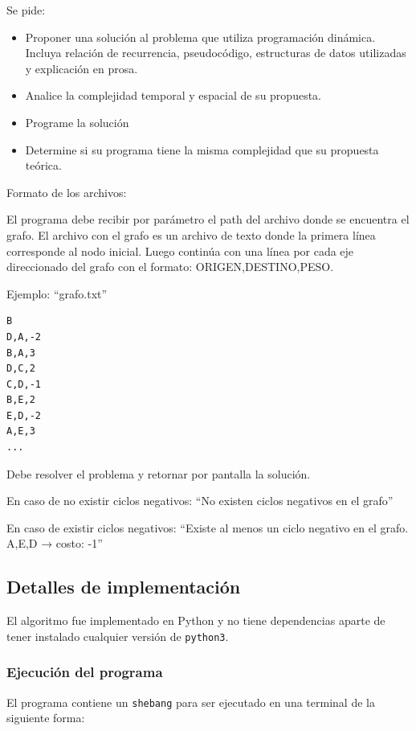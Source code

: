 \documentclass[titlepage,a4paper]{article}
\begin{document}
Se pide:

\begin{itemize}
\item Proponer una solución al problema que utiliza programación dinámica. Incluya relación de recurrencia, pseudocódigo, estructuras de datos utilizadas y explicación en prosa.

\item Analice la complejidad temporal y espacial de su propuesta.

\item Programe la solución

\item Determine si su programa tiene la misma complejidad que su propuesta teórica.
\end{itemize}

Formato de los archivos:

El programa debe recibir por parámetro el path del archivo donde se encuentra el grafo. El archivo con el grafo es un archivo de texto donde la primera línea corresponde al nodo inicial. Luego continúa con una línea por cada eje direccionado del grafo con el formato: ORIGEN,DESTINO,PESO.

Ejemplo: “grafo.txt”

\begin{verbatim}
B
D,A,-2
B,A,3
D,C,2
C,D,-1
B,E,2
E,D,-2
A,E,3
...
\end{verbatim}

Debe resolver el problema y retornar por pantalla la solución.

En caso de no existir ciclos negativos: “No existen ciclos negativos en el grafo”

En caso de existir ciclos negativos: “Existe al menos un ciclo negativo en el grafo. A,E,D → costo: -1”


\subsection{Detalles de implementación}
\label{sec:org7067418}

El algoritmo fue implementado en Python y no tiene dependencias aparte de tener
instalado cualquier versión de \texttt{python3}.

\subsubsection{Ejecución del programa}
\label{sec:orgbe475bd}

El programa contiene un \texttt{shebang} para ser ejecutado en una terminal de la
siguiente forma:
\end{document}
